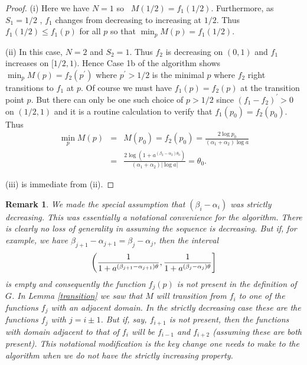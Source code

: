 \documentclass{amsart}
\theoremstyle{plain}
\newtheorem{remark}{Remark}
\numberwithin{equation}{section}
\begin{document}
\begin{proof}
(i) Here we have $N=1$ so \ $M(1/2)=f_{1}(1/2)$. Furthermore, as $S_{1}=1/2$%
, $f_{1}$ changes from decreasing to increasing at $1/2$. Thus $%
f_{1}(1/2)\leq f_{1}(p)$ for all $p$ so that $\min_{p}M(p)=f_{1}(1/2)$.

(ii) In this case, $N=2$ and $S_{2}=1$. Thus $f_{2}$ is decreasing on $(0,1)$
and $f_{1}$ increases on $[1/2,1)$. Hence Case 1b of the algorithm shows $%
\min_{p}M(p)=f_{2}(p^{\prime })$ where $p^{\prime }>1/2$ is the minimal $p$
where $f_{2}$ right transitions to $f_{1}$ at $p$. Of course we must have $%
f_{1}(p)=f_{2}(p)$ at the transition point $p$. But there can only be one
such choice of $p>1/2$ since $(f_{1}-f_{2})^{\prime }>0$ on $(1/2,1)$ and it
is a routine calculation to verify that $f_{1}(p_{0})=f_{2}(p_{0})$. Thus 
\begin{eqnarray*}
\min_{p}M(p) &=&M(p_{0})=f_{2}(p_{0})=\frac{2\log p_{0}}{(\alpha _{1}+\alpha
_{2})\log a} \\
&=&\frac{2\log (1+a^{(\beta _{2}-\alpha _{2})\theta _{0}})}{(\alpha
_{1}+\alpha _{2})\left\vert \log a\right\vert }=\theta _{0}.
\end{eqnarray*}

(iii) is immediate from (ii).
\end{proof}

\begin{remark}
We made the special assumption that $(\beta _{i}-\alpha _{i})$ was strictly
decreasing. This was essentially a notational convenience for the algorithm.
There is clearly no loss of generality in assuming the sequence is decreasing. 
But if, for example, we have $\beta _{j+1}-\alpha _{j+1}=\beta _{j}-\alpha _{j}$,
then the interval 
\begin{equation*}
\left( \frac{1}{1+a^{(\beta _{j+1}-\alpha _{j+1})\theta }},\frac{1}{%
1+a^{(\beta _{j}-\alpha _{j})\theta }}\right]
\end{equation*}%
is empty and consequently the function $f_{j}(p)$ is not present in the
definition of $G$. In Lemma \ref{transition} we saw that $M$ will transition
from $f_{i}$ to one of the functions $f_{j}$ with an adjacent domain. In the
strictly decreasing case these are the functions $f_{j}$ with $j=i\pm 1$.
But if, say, $f_{i+1}$ is not present, then the functions with domain
adjacent to that of $f_{i}$ will be $f_{i-1}$ and $f_{i+2}$ (assuming these
are both present). This notational modification is the key change one needs
to make to the algorithm when we do not have the strictly increasing
property.
\end{remark}
\end{document}
